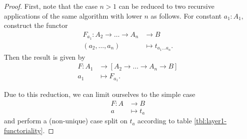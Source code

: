 \documentclass[a4paper]{article}
\theoremstyle{definition}
\theoremstyle{remark}
\begin{document}
\begin{proof}
  First, note that the case $n > 1$ can be reduced to two recursive applications of the same
  algorithm with lower $n$ as follows. For constant $a_1 : A_1,$ construct the functor
  \begin{align*}
    F_{a_1} : A_2 \to \dots \to A_n &\to     B\\
              (a_2,\dots,a_n)       &\mapsto t_{a_1 \dots a_n}.
  \end{align*}
  Then the result is given by
  \begin{align*}
    F : A_1 &\to     [A_2 \to \dots \to A_n \to B]\\
        a_1 &\mapsto F_{a_1}.
  \end{align*}

  Due to this reduction, we can limit ourselves to the simple case
  \begin{align*}
    F : A &\to     B\\
        a &\mapsto t_a
  \end{align*}
  and perform a (non-unique) case split on $t_a$ according to table \ref{tbl:layer1-functoriality}.


\end{proof}
\end{document}

